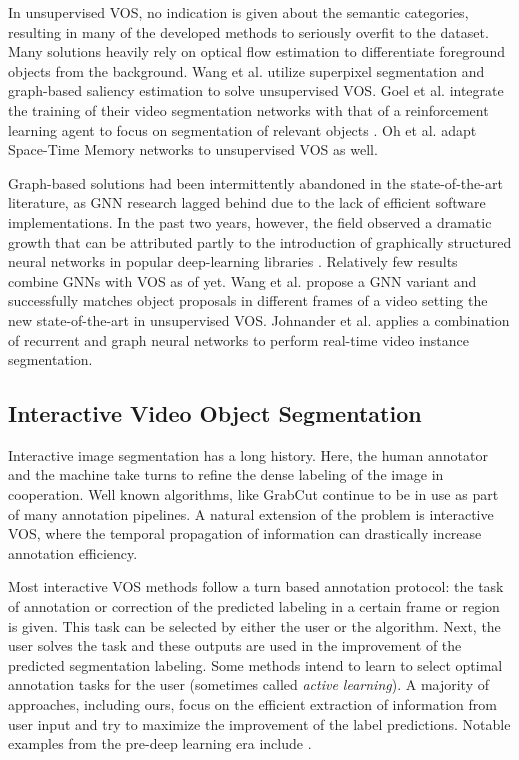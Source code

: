 \documentclass[conference]{IEEEtran}
\begin{document}
In unsupervised VOS, no indication is given about the semantic categories, resulting in many of the developed methods to seriously overfit to the dataset. Many solutions heavily rely on optical flow estimation to differentiate foreground objects from the background. Wang et al. utilize superpixel segmentation and graph-based saliency estimation \cite{vos_unsup_saliency} to solve unsupervised VOS. Goel et al. integrate the training of their video segmentation networks with that of a reinforcement learning agent to focus on segmentation of relevant objects \cite{vos_unsup_rl}. Oh et al. adapt \cite{vos_unsup_stm} Space-Time Memory networks to unsupervised VOS as well.

Graph-based solutions had been intermittently abandoned in the state-of-the-art literature, as GNN research lagged behind due to the lack of efficient software implementations. In the past two years, however, the field observed a dramatic growth that can be attributed partly to the introduction of graphically structured neural networks in popular deep-learning libraries \cite{pytorch, gnn_dgl}. Relatively few results combine GNNs with VOS as of yet. Wang et al. \cite{gnn_vos_zeroshot} propose a GNN variant and successfully matches object proposals in different frames of a video setting the new state-of-the-art in unsupervised VOS. Johnander et al. \cite{gnn_vos_unpub} applies a combination of recurrent and graph neural networks to perform real-time video instance segmentation. 

\subsection{Interactive Video Object Segmentation} \label{subsection:related_ivos}

Interactive image segmentation has a long history. Here, the human annotator and the machine take turns to refine the dense labeling of the image in cooperation. Well known algorithms, like GrabCut \cite{grabcut} continue to be in use as part of many annotation pipelines. A natural extension of the problem is interactive VOS, where the temporal propagation of information can drastically increase annotation efficiency.

Most interactive VOS methods follow a turn based annotation protocol: the task of annotation or correction of the predicted labeling in a certain frame or region is given. This task can be selected by either the user or the algorithm. Next, the user solves the task and these outputs are used in the improvement of the predicted segmentation labeling. Some methods \cite{activelearn_eccv12, activelearn_cvpr14, rlseg} intend to learn to select optimal annotation tasks for the user (sometimes called \textit{active learning}). A majority of approaches, including ours, focus on the efficient extraction of information from user input and try to maximize the improvement of the label predictions. Notable examples from the pre-deep learning era include \cite{interactive_livecut_iccv09, interactive_nagaraja_iccv15}.
\end{document}
